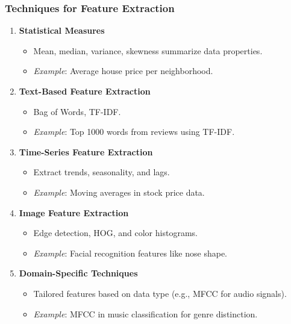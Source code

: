 \documentclass[aspectratio=169]{beamer}
\begin{document}
\begin{frame}[fragile]
    \frametitle{Techniques for Feature Extraction}
    \begin{enumerate}
        \item \textbf{Statistical Measures}
            \begin{itemize}
                \item Mean, median, variance, skewness summarize data properties.
                \item \textit{Example}: Average house price per neighborhood.
            \end{itemize}

        \item \textbf{Text-Based Feature Extraction}
            \begin{itemize}
                \item Bag of Words, TF-IDF.
                \item \textit{Example}: Top 1000 words from reviews using TF-IDF.
            \end{itemize}
        
        \item \textbf{Time-Series Feature Extraction}
            \begin{itemize}
                \item Extract trends, seasonality, and lags.
                \item \textit{Example}: Moving averages in stock price data.
            \end{itemize}
        
        \item \textbf{Image Feature Extraction}
            \begin{itemize}
                \item Edge detection, HOG, and color histograms.
                \item \textit{Example}: Facial recognition features like nose shape.
            \end{itemize}
         
        \item \textbf{Domain-Specific Techniques}
            \begin{itemize}
                \item Tailored features based on data type (e.g., MFCC for audio signals).
                \item \textit{Example}: MFCC in music classification for genre distinction.
            \end{itemize}
    \end{enumerate}
\end{frame}
\end{document}
